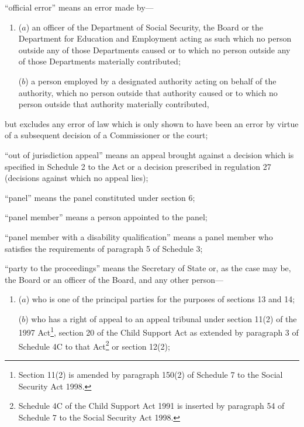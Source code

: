 \documentclass[12pt,a4paper]{article}
\begin{document}
\begin{enumerate}
“official error” means an error made by—
\begin{enumerate}\item[]
    ($a$) 
    an officer of the Department of Social Security, the Board or the Department for Education and Employment acting as such which no person outside any of those Departments caused or to which no person outside any of those Departments materially contributed;


($b$) a person employed by a designated authority acting on behalf of the authority, which no person outside that authority caused or to which no person outside that authority materially contributed,
\end{enumerate}
but excludes any error of law which is only shown to have been an error by virtue of a subsequent decision of a Commissioner or the court;

“out of jurisdiction appeal” means an appeal brought against a decision which is specified in Schedule 2 to the Act or a decision prescribed in regulation 27 (decisions against which no appeal lies);

“panel” means the panel constituted under section 6;

“panel member” means a person appointed to the panel;

“panel member with a disability qualification” means a panel member who satisfies the requirements of paragraph 5 of Schedule 3;

“party to the proceedings” means the Secretary of State 
or, as the case may be, the Board or an officer of the Board,  %
and any other person—
\begin{enumerate}\item[]
($a$) who is one of the principal parties for the purposes of sections 13 and 14;

($b$) who has a right of appeal to an appeal tribunal under section 11(2) of the 1997 Act\footnote{\frenchspacing Section 11(2) is amended by paragraph 150(2) of Schedule 7 to the Social Security Act 1998.}, section 20 of the Child Support Act as extended by paragraph 3 of Schedule 4C to that Act\footnote{\frenchspacing Schedule 4C of the Child Support Act 1991 is inserted by paragraph 54 of Schedule 7 to the Social Security Act 1998.} or section 12(2);
\end{enumerate}


\end{enumerate}
\end{document}
